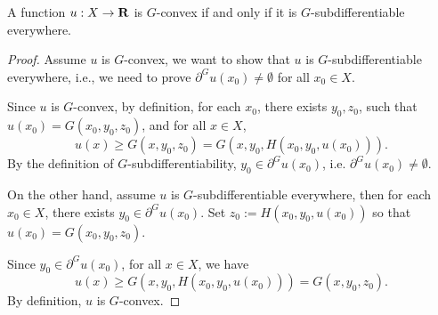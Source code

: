 \begin{lemma}\label{convex-subdiff0}
A function $u: X \rightarrow {\mathbf R}$ is $G$-convex if and only if it is $G$-subdifferentiable everywhere.
\end{lemma}
\begin{proof}[Proof]
		Assume $u$ is $G$-convex, we want to show that $u$ is $G$-subdifferentiable everywhere, i.e., we need to prove  $\partial^G u(x_0)\neq \emptyset$ for all $x_0\in X$.
		
		Since $u$ is $G$-convex, by definition, for each $x_0$, there exists $ y_0, z_0$, such that $u(x_0) = G(x_0,y_0,z_0)$, and for all  $ x \in X$, 
		\begin{equation*}
		u(x)\ge G(x, y_0, z_0) = G(x, y_0, H(x_0,y_0,u(x_0))).
		\end{equation*}
		By the definition of $G$-subdifferentiability, $y_0 \in \partial^G u(x_0)$, i.e. $\partial^G u(x_0) \neq \emptyset$.
		
		On the other hand, assume $u$ is $G$-subdifferentiable everywhere, then for each $ x_0 \in X$,  there exists $ y_0 \in \partial^G u(x_0)$. Set $z_0:=H(x_0,y_0,u(x_0))$ so that $u(x_0) = G(x_0, y_0, z_0)$.
		
		Since $y_0\in \partial^G u(x_0)$, for all $x\in X$, we have 
		\begin{equation*}
		u(x)\ge G(x,y_0,H(x_0,y_0,u(x_0))) = G(x,y_0,z_0).
		\end{equation*}
		By definition, $u$ is $G$-convex.
\end{proof}
%	
%	
%	
%	
%	
				
